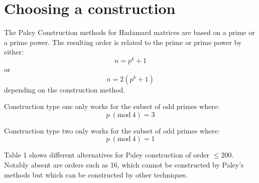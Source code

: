 \documentclass{article}
\newcommand{\Mod}[1]{\ (\mathrm{mod}\ #1)}
\begin{document}
\section{Choosing a construction}

The Paley Construction methods for Hadamard matrices are based on a prime or a prime
power.  The resulting order is related to the prime or prime power by either:
\begin{equation}
n = p^k + 1
\end{equation}
or
\begin{equation}
n = 2 (p^k + 1)
\end{equation}
depending on the construction method.

\bigskip
Construction type one only works for the subset of odd primes where:
\begin{equation}
p\Mod{4} = 3
\end{equation}

Construction type two only works for the subset of odd primes where:
\begin{equation}
p\Mod{4} = 1
\end{equation}

Table 1 shows different alternatives for
Paley construction of order $\le 200$.  Notably absent are orders such as 16, which
cannot be constructed by Paley's methods but which can be constructed by other techniques.
\end{document}

